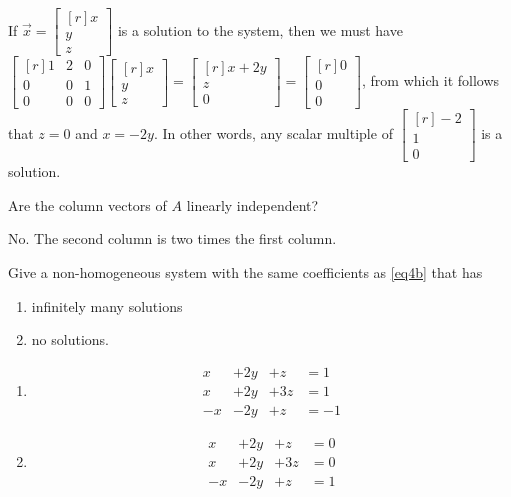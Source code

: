\documentclass{problemset}
\newcommand{\mat}[1]{\begin{bmatrix*}[r]#1\end{bmatrix*}}
\begin{document}
\begin{parts}
\begin{solution}
				If $\vec x=\mat{x\\y\\z}$ is a solution to the system, then we
				must have $\mat{1&2&0\\0&0&1\\0&0&0}\mat{x\\y\\z}=\mat{x+2y\\z\\0}=\mat{0\\0\\0}$,
				from which it follows that $z=0$ and $x=-2y$. In other words, 
				any scalar multiple of $\mat{-2\\1\\0}$ is a solution. 
			\end{solution}
		\item Are the column vectors of $A$ linearly independent?
			\begin{solution}
				No. The second column is two times the first column.
			\end{solution}
		\item Give a non-homogeneous system with the same coefficients as \eqref{eq4b} that has
			\begin{enumerate}
				\item infinitely many solutions
				\item no solutions.
			\end{enumerate}
			\begin{solution}
				\begin{enumerate}
					\item
						\begin{equation*}\label{eq4b}
							\begin{array}{llll}
								x&+2y&+z &= 1\\
								x&+2y&+3z &= 1\\
								-x&-2y&+z &= -1
							\end{array}
						\end{equation*}
					\item
						\begin{equation*}\label{eq4b}
							\begin{array}{llll}
								x&+2y&+z &= 0\\
								x&+2y&+3z &= 0\\
								-x&-2y&+z &= 1
							\end{array}
						\end{equation*}
				\end{enumerate}
			\end{solution}
	\end{parts}
\end{document}
